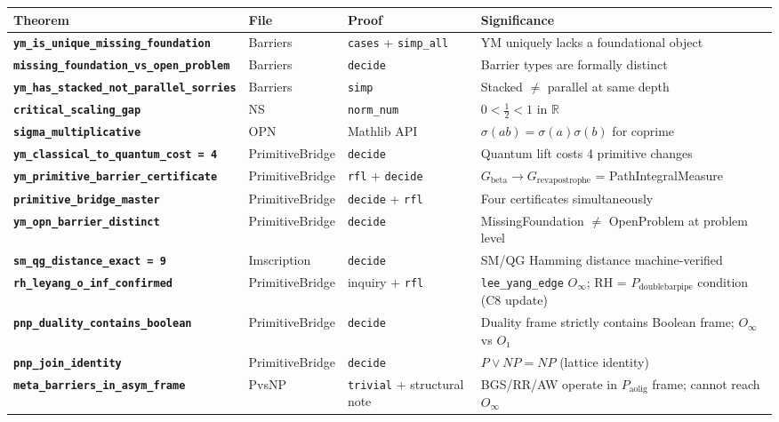 \documentclass[12pt,a4paper]{article}
\begin{document}
\begin{table}[htbp]
\centering
\small
{}
\begin{tabularx}{\textwidth}{>{\centering\arraybackslash}X >{\centering\arraybackslash}X >{\centering\arraybackslash}X >{\centering\arraybackslash}X}
\toprule
\rowcolor{gray!25}\textbf{Theorem} & \textbf{File} & \textbf{Proof} & \textbf{Significance} \\
\midrule
\rowcolors{1}{white}{gray!10}
\textbf{\texttt{ym\_is\_unique\_missing\_foundation}} & Barriers & \texttt{cases} + \texttt{simp\_all} & YM uniquely lacks a foundational object \\
\textbf{\texttt{missing\_foundation\_vs\_open\_problem}} & Barriers & \texttt{decide} & Barrier types are formally distinct \\
\textbf{\texttt{ym\_has\_stacked\_not\_parallel\_sorries}} & Barriers & \texttt{simp} & Stacked $\neq$ parallel at same depth \\
\textbf{\texttt{critical\_scaling\_gap}} & NS & \texttt{norm\_num} & $0 < \frac{1}{2} < 1$ in $\mathbb{R}$ \\
\textbf{\texttt{sigma\_multiplicative}} & OPN & Mathlib API & $\sigma(ab) = \sigma(a)\sigma(b)$ for coprime \\
\textbf{\texttt{ym\_classical\_to\_quantum\_cost = 4}} & PrimitiveBridge & \texttt{decide} & Quantum lift costs 4 primitive changes \\
\textbf{\texttt{ym\_primitive\_barrier\_certificate}} & PrimitiveBridge & \texttt{rfl} + \texttt{decide} & $G_{\text{beta}} \to G_{\text{revapostrophe}}$ = PathIntegralMeasure \\
\textbf{\texttt{primitive\_bridge\_master}} & PrimitiveBridge & \texttt{decide} + \texttt{rfl} & Four certificates simultaneously \\
\textbf{\texttt{ym\_opn\_barrier\_distinct}} & PrimitiveBridge & \texttt{decide} & MissingFoundation $\neq$ OpenProblem at problem level \\
\textbf{\texttt{sm\_qg\_distance\_exact = 9}} & Imscription & \texttt{decide} & SM/QG Hamming distance machine-verified \\
\textbf{\texttt{rh\_leyang\_o\_inf\_confirmed}} & PrimitiveBridge & inquiry + \texttt{rfl} & \texttt{lee\_yang\_edge} $O_{\infty}$; RH = $P_{\text{doublebarpipe}}$ condition (C8 update) \\
\textbf{\texttt{pnp\_duality\_contains\_boolean}} & PrimitiveBridge & \texttt{decide} & Duality frame strictly contains Boolean frame; $O_{\infty}$ vs $O₁$ \\
\textbf{\texttt{pnp\_join\_identity}} & PrimitiveBridge & \texttt{decide} & $P \vee NP = NP$ (lattice identity) \\
\textbf{\texttt{meta\_barriers\_in\_asym\_frame}} & PvsNP & \texttt{trivial} + structural note & BGS/RR/AW operate in $P_{\text{aolig}}$ frame; cannot reach $O_{\infty}$ \\
\bottomrule
\end{tabularx}
\end{table}
\end{document}
